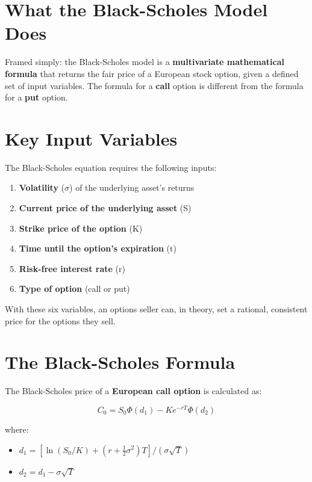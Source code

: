 \documentclass[12pt,openany]{book}
\theoremstyle{definition}
\theoremstyle{remark}
\begin{document}
\section{What the Black-Scholes Model Does}

Framed simply: the Black-Scholes model is a \textbf{multivariate mathematical formula} that returns the fair price of a European stock option, given a defined set of input variables. The formula for a \textbf{call} option is different from the formula for a \textbf{put} option.

\section{Key Input Variables}

The Black-Scholes equation requires the following inputs:

\begin{enumerate}
\item \textbf{Volatility} (\(\sigma\)) of the underlying asset's returns


\item \textbf{Current price of the underlying asset} (S)


\item \textbf{Strike price of the option} (K)


\item \textbf{Time until the option's expiration} (t)


\item \textbf{Risk-free interest rate} (r)


\item \textbf{Type of option} (call or put)


\end{enumerate}

With these six variables, an options seller can, in theory, set a rational, consistent price for the options they sell.

\section{The Black-Scholes Formula}

The Black-Scholes price of a \textbf{European call option} is calculated as:

\[
\boxed{C_0=S_0\Phi(d_1)-Ke^{-rT}\Phi(d_2)}
\]

where:

\begin{itemize}
\item \(d_1=[\ln(S_0/K)+(r+\tfrac12\sigma^2)T]/(\sigma\sqrt{T})\)


\item \(d_2=d_1-\sigma\sqrt{T}\)


\end{itemize}
\end{document}
